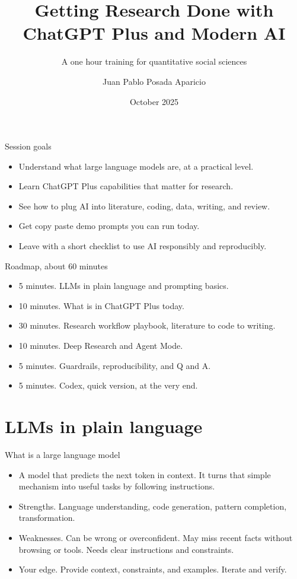 \documentclass[aspectratio=169,professionalfonts]{beamer}
\title{Getting Research Done with ChatGPT Plus and Modern AI}
\subtitle{A one hour training for quantitative social sciences}
\author{Juan Pablo Posada Aparicio}
\institute{Institute for Replication, University of Ottawa}
\date{October 2025}
\begin{document}
\begin{frame}
  \titlepage
\end{frame}

\begin{frame}{Session goals}
  \begin{itemize}
    \item Understand what large language models are, at a practical level.
    \item Learn ChatGPT Plus capabilities that matter for research.
    \item See how to plug AI into literature, coding, data, writing, and review.
    \item Get copy paste demo prompts you can run today.
    \item Leave with a short checklist to use AI responsibly and reproducibly.
  \end{itemize}
\end{frame}

\begin{frame}{Roadmap, about 60 minutes}
  \begin{itemize}
    \item 5 minutes. LLMs in plain language and prompting basics.
    \item 10 minutes. What is in ChatGPT Plus today.
    \item 30 minutes. Research workflow playbook, literature to code to writing.
    \item 10 minutes. Deep Research and Agent Mode.
    \item 5 minutes. Guardrails, reproducibility, and Q and A.
    \item 5 minutes. Codex, quick version, at the very end.
  \end{itemize}
\end{frame}

\section{LLMs in plain language}

\begin{frame}{What is a large language model}
  \begin{itemize}
    \item A model that predicts the next token in context. It turns that simple mechanism into useful tasks by following instructions.
    \item Strengths. Language understanding, code generation, pattern completion, transformation.
    \item Weaknesses. Can be wrong or overconfident. May miss recent facts without browsing or tools. Needs clear instructions and constraints.
    \item Your edge. Provide context, constraints, and examples. Iterate and verify.
  \end{itemize}
\end{frame}
\end{document}
